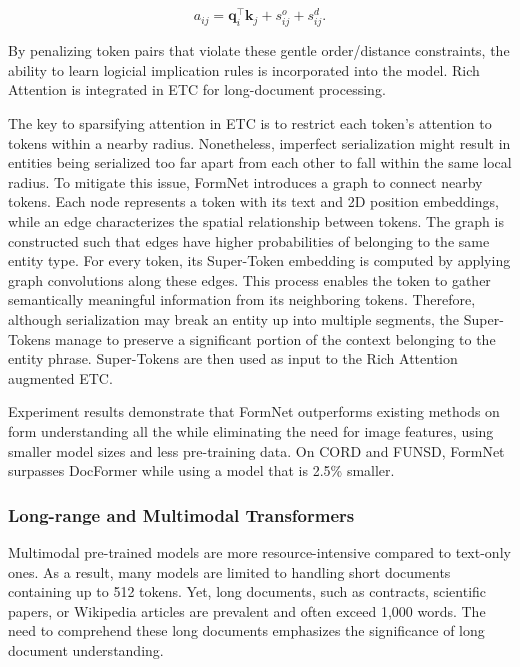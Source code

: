 \begin{equation}
    a_{ij} = \bm{q}_i^{\top} \bm{k}_j + s^{o}_{ij} + s^{d}_{ij}.
\end{equation}

\noindent By penalizing token pairs that violate these gentle order/distance constraints, the ability to learn logicial implication rules is incorporated into the model. Rich Attention is integrated in \ac{ETC} for long-document processing.

The key to sparsifying attention in \ac{ETC} is to restrict each token's attention to tokens within a nearby radius. Nonetheless, imperfect serialization might result in entities being serialized too far apart from each other to fall within the same local radius. To mitigate this issue, FormNet introduces a graph to connect nearby tokens. Each node represents a token with its text and 2D position embeddings, while an edge characterizes the spatial relationship between tokens. The graph is constructed such that edges have higher probabilities of belonging to the same entity type. For every token, its Super-Token embedding is computed by applying graph convolutions along these edges. This process enables the token to gather semantically meaningful information from its neighboring tokens. Therefore, although serialization may break an entity up into multiple segments, the Super-Tokens manage to preserve a significant portion of the context belonging to the entity phrase. Super-Tokens are then used as input to the Rich Attention augmented \ac{ETC}. 

Experiment results demonstrate that FormNet outperforms existing methods on form understanding all the while eliminating the need for image features, using smaller model sizes and less pre-training data. On CORD and FUNSD, FormNet surpasses DocFormer while using a model that is 2.5\% smaller.


\subsubsection{Long-range and Multimodal Transformers}

Multimodal pre-trained models are more resource-intensive compared to text-only ones. As a result, many models are limited to handling short documents containing up to 512 tokens. Yet, long documents, such as contracts, scientific papers, or Wikipedia articles are prevalent and often exceed 1,000 words. The need to comprehend these long documents emphasizes the significance of long document understanding.

